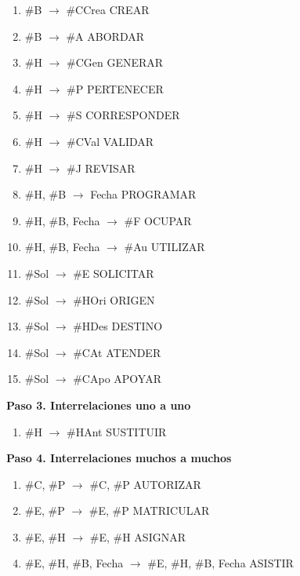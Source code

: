 \begin{enumerate}[label=f\arabic*,start=13,leftmargin=3em]
  \item \#B \ensuremath{\to} \#CCrea \hfill {\small\color{gris}CREAR}
  \item \#B \ensuremath{\to} \#A \hfill {\small\color{gris}ABORDAR}
  \item \#H \ensuremath{\to} \#CGen \hfill {\small\color{gris}GENERAR}
  \item \#H \ensuremath{\to} \#P \hfill {\small\color{gris}PERTENECER}
  \item \#H \ensuremath{\to} \#S \hfill {\small\color{gris}CORRESPONDER}
  \item \#H \ensuremath{\to} \#CVal \hfill {\small\color{gris}VALIDAR}
  \item \#H \ensuremath{\to} \#J \hfill {\small\color{gris}REVISAR}
  \item \#H, \#B \ensuremath{\to} Fecha \hfill {\small\color{gris}PROGRAMAR}
  \item \#H, \#B, Fecha \ensuremath{\to} \#F \hfill {\small\color{gris}OCUPAR}
  \item \#H, \#B, Fecha \ensuremath{\to} \#Au \hfill {\small\color{gris}UTILIZAR}
  \item \#Sol \ensuremath{\to} \#E \hfill {\small\color{gris}SOLICITAR}
  \item \#Sol \ensuremath{\to} \#HOri \hfill {\small\color{gris}ORIGEN}
  \item \#Sol \ensuremath{\to} \#HDes \hfill {\small\color{gris}DESTINO}
  \item \#Sol \ensuremath{\to} \#CAt \hfill {\small\color{gris}ATENDER}
  \item \#Sol \ensuremath{\to} \#CApo \hfill {\small\color{gris}APOYAR}
\end{enumerate}
\textbf{Paso 3. Interrelaciones uno a uno}
\begin{enumerate}[label=f\arabic*,start=28,leftmargin=3em]
  \item \#H \ensuremath{\to} \#HAnt \hfill {\small\color{gris}SUSTITUIR}
\end{enumerate}
\textbf{Paso 4. Interrelaciones muchos a muchos}
\begin{enumerate}[label=f\arabic*,start=29,leftmargin=3em]
  \item \#C, \#P \ensuremath{\to} \#C, \#P \hfill {\small\color{gris}AUTORIZAR}
  \item \#E, \#P \ensuremath{\to} \#E, \#P \hfill {\small\color{gris}MATRICULAR}
  \item \#E, \#H \ensuremath{\to} \#E, \#H \hfill {\small\color{gris}ASIGNAR}
  \item \#E, \#H, \#B, Fecha \ensuremath{\to} \#E, \#H, \#B, Fecha \hfill {\small\color{gris}ASISTIR}
\end{enumerate}
